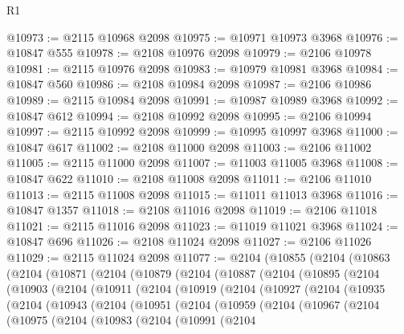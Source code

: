 \begin{lexlean}{R1}
\begin{coremodule}
@10973 := @2115 @10968 @2098
@10975 := @10971 @10973 @3968
@10976 := @10847 @555
@10978 := @2108 @10976 @2098
@10979 := @2106 @10978
@10981 := @2115 @10976 @2098
@10983 := @10979 @10981 @3968
@10984 := @10847 @560
@10986 := @2108 @10984 @2098
@10987 := @2106 @10986
@10989 := @2115 @10984 @2098
@10991 := @10987 @10989 @3968
@10992 := @10847 @612
@10994 := @2108 @10992 @2098
@10995 := @2106 @10994
@10997 := @2115 @10992 @2098
@10999 := @10995 @10997 @3968
@11000 := @10847 @617
@11002 := @2108 @11000 @2098
@11003 := @2106 @11002
@11005 := @2115 @11000 @2098
@11007 := @11003 @11005 @3968
@11008 := @10847 @622
@11010 := @2108 @11008 @2098
@11011 := @2106 @11010
@11013 := @2115 @11008 @2098
@11015 := @11011 @11013 @3968
@11016 := @10847 @1357
@11018 := @2108 @11016 @2098
@11019 := @2106 @11018
@11021 := @2115 @11016 @2098
@11023 := @11019 @11021 @3968
@11024 := @10847 @696
@11026 := @2108 @11024 @2098
@11027 := @2106 @11026
@11029 := @2115 @11024 @2098
@11077 := @2104
    (@10855
      (@2104
        (@10863
          (@2104
            (@10871
              (@2104
                (@10879
                  (@2104
                    (@10887
                      (@2104
                        (@10895
                          (@2104
                            (@10903
                              (@2104
                                (@10911
                                  (@2104
                                    (@10919
                                      (@2104
                                        (@10927
                                          (@2104
                                            (@10935
                                              (@2104
                                                (@10943
                                                  (@2104
                                                    (@10951
                                                      (@2104
                                                        (@10959
                                                          (@2104
                                                            (@10967
                                                              (@2104
                                                                (@10975
                                                                  (@2104
                                                                    (@10983
                                                                      (@2104
                                                                        (@10991
                                                                          (@2104

\end{coremodule}
\end{lexlean}
